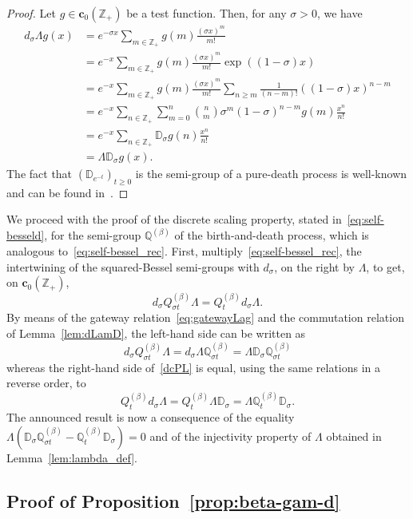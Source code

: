 \documentclass[AHL,Unicode,longabstracts]{cedram}
\newcommand{\cD}{{\discret{D}}}
\newcommand{\ZZ}{\mathbb{Z}}
\newcommand{\dBs}{{\discret{Q}}}
\newcommand{\Bs}{Q}
\newcommand{\esc}{\mathbf{c}}
\newcommand{\discret}[1]{\mathds{#1}}
\begin{document}
\begin{proof}
Let $g\in \esc_0(\ZZ_+)$ be a test function. Then, for any $\sigma>0$, we have
\begin{align*}
d_\sigma\Lambda g(x)&=e^{-\sigma x}\sum_{m\in\ZZ_+}g(m)\frac{(\sigma x)^m}{m!}\\
&=e^{-x}\sum_{m\in\ZZ_+}g(m)\frac{(\sigma x)^m}{m!}\exp((1-\sigma)x)\\
&=e^{-x}\sum_{m\in\ZZ_+}g(m)\frac{(\sigma x)^m}{m!}\sum_{n\geq m}\frac{1}{(n-m)!}((1-\sigma)x)^{n-m}\\
&=e^{-x}\sum_{n\in\ZZ_+}\sum_{m=0}^n\binom{n}{m}\sigma^m(1-\sigma)^{n-m}g(m)\frac{x^n}{n!}\\
&=e^{-x}\sum_{n\in\ZZ_+}\discret{D}_\sigma g(n)\frac{x^n}{n!}\\
&=\Lambda \discret{D}_\sigma g(x).
\end{align*}
The fact that $ (\cD_{e^{-t}})_{t \geq 0}$ is the semi-group of a pure-death process is well-known and can be found in~\cite[Proposition~3.3]{Biane-int}.
\end{proof}

We proceed with the proof of the discrete scaling property, stated in~\eqref{eq:self-besseld}, for the semi-group $\dBs^{(\beta)}$ of the birth-and-death process, which is analogous to~\eqref{eq:self-bessel_rec}. First, multiply~\eqref{eq:self-bessel_rec}, the intertwining of the squared-Bessel semi-groups with $d_\sigma$, on the right by $\Lambda$, to get, on $\esc_0(\ZZ_+)$,
\begin{equation}\label{dcPL}
d_\sigma\Bs^{(\beta)}_{\sigma t}\Lambda =\Bs_t^{(\beta)} d_\sigma\Lambda.
\end{equation}
By means of the gateway relation~\eqref{eq:gatewayLag} and the commutation relation of Lemma~\ref{lem:dLamD}, the left-hand side can be written as
\[
d_\sigma\Bs_{\sigma t}^{(\beta)}\Lambda=d_\sigma \Lambda \dBs_{\sigma t}^{(\beta)}=\Lambda \discret{D}_\sigma \dBs_{\sigma t}^{(\beta)}
\]
whereas the right-hand side of~\eqref{dcPL} is equal, using the same relations in a reverse order, to
\[
\Bs_t^{(\beta)} d_\sigma\Lambda=\Bs_t^{(\beta)}\Lambda \discret{D}_\sigma =\Lambda \dBs_t^{(\beta)} \discret{D}_\sigma.
\]
The announced result is now a consequence of the equality $\Lambda(\discret{D}_\sigma \dBs_{\sigma t}^{(\beta)}-\dBs_t^{(\beta)} \discret{D}_\sigma)=0$ and of the injectivity property of $\Lambda$ obtained in Lemma~\ref{lem:lambda_def}.

\subsection{Proof of Proposition~\ref{prop:beta-gam-d}}
\end{document}
